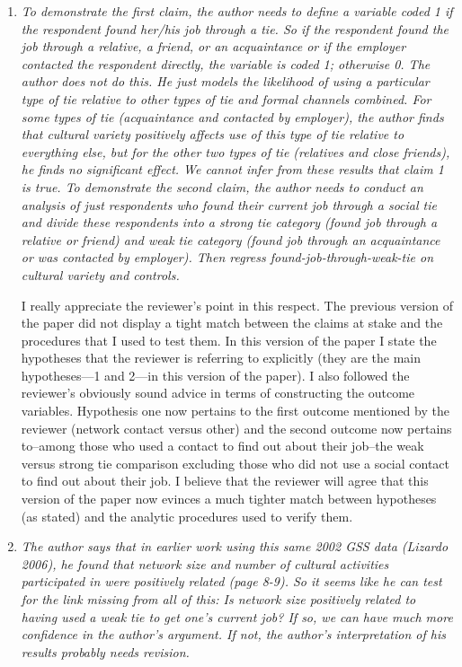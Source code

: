 \documentclass[11pt]{article}
\begin{document}
\begin{enumerate}
	\item \emph{To demonstrate the first claim, the author needs to define a variable coded 1 if the respondent found her/his job through a tie. So if the respondent found the job through a relative, a friend, or an acquaintance or if the employer contacted the respondent directly, the variable is coded 1; otherwise 0.  The author does not do this. He just models the likelihood of using a particular type of tie relative to other types of tie and formal channels combined. For some types of tie (acquaintance and contacted by employer), the author finds that cultural variety positively affects use of this type of tie relative to everything else, but for the other two types of tie (relatives and close friends), he finds no significant effect. We cannot infer from these results that claim 1 is true.  To demonstrate the second claim, the author needs to conduct an analysis of just respondents who found their current job through a social tie and divide these respondents into a strong tie category (found job through a relative or friend) and weak tie category (found job through an acquaintance or was contacted by employer). Then regress found-job-through-weak-tie on cultural variety and controls.}
	
	I really appreciate the reviewer's point in this respect. The previous version of the paper did not display a tight match between the claims at stake and the procedures that I used to test them.  In this version of the paper I state the hypotheses that the reviewer is referring to explicitly (they are the main hypotheses---1 and 2---in this version of the paper).  I also followed the reviewer's obviously sound advice in terms of constructing the outcome variables.  Hypothesis one now pertains to the first outcome mentioned by the reviewer (network contact versus other) and the second outcome now pertains to--among those who used a contact to find out about their job--the weak versus strong tie comparison excluding those who did not use a social contact to find out about their job.   I believe that the reviewer will agree that this version of the paper now evinces a much tighter match between hypotheses (as stated) and the analytic procedures used to verify them.
	
	\item \emph{The author says that in earlier work using this same 2002 GSS data (Lizardo 2006), he found that network size and number of cultural activities participated in were positively related (page 8-9). So it seems like he can test for the link missing from all of this: Is network size positively related to having used a weak tie to get one's current job? If so, we can have much more confidence in the author's argument. If not, the author's interpretation of his results probably needs revision.}	
	

\end{enumerate}
\end{document}
